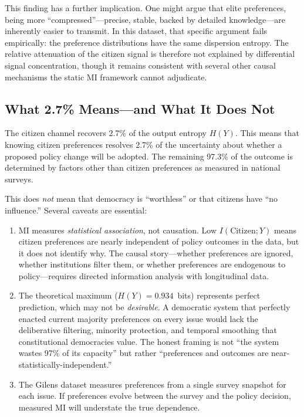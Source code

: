 \documentclass[twocolumn,10pt]{article}
\begin{document}
This finding has a further implication.  One might argue that elite preferences, being more ``compressed''---precise, stable, backed by detailed knowledge---are inherently easier to transmit.  In this dataset, that specific argument fails empirically: the preference distributions have the same dispersion entropy.  The relative attenuation of the citizen signal is therefore not explained by differential signal concentration, though it remains consistent with several other causal mechanisms the static MI framework cannot adjudicate.

\subsection{What 2.7\% Means---and What It Does Not}

The citizen channel recovers 2.7\% of the output entropy $H(Y)$.  This means that knowing citizen preferences resolves 2.7\% of the uncertainty about whether a proposed policy change will be adopted.  The remaining 97.3\% of the outcome is determined by factors other than citizen preferences as measured in national surveys.

This does \emph{not} mean that democracy is ``worthless'' or that citizens have ``no influence.''  Several caveats are essential:

\begin{enumerate}
\item MI measures \emph{statistical association}, not causation.  Low $I(\text{Citizen}; Y)$ means citizen preferences are nearly independent of policy outcomes in the data, but it does not identify why.  The causal story---whether preferences are ignored, whether institutions filter them, or whether preferences are endogenous to policy---requires directed information analysis with longitudinal data.

\item The theoretical maximum ($H(Y) = 0.934$~bits) represents perfect prediction, which may not be \emph{desirable}.  A democratic system that perfectly enacted current majority preferences on every issue would lack the deliberative filtering, minority protection, and temporal smoothing that constitutional democracies value.  The honest framing is not ``the system wastes 97\% of its capacity'' but rather ``preferences and outcomes are near-statistically-independent.''

\item The Gilens dataset measures preferences from a single survey snapshot for each issue.  If preferences evolve between the survey and the policy decision, measured MI will understate the true dependence.
\end{enumerate}
\end{document}
